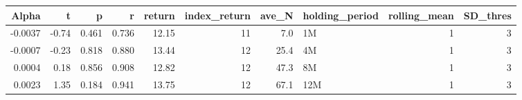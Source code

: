 \begin{table}[ht]
\centering
\begin{tabular}{rrrrrrrlrr}
  \hline
Alpha & t & p & r & return & index\_return & ave\_N & holding\_period & rolling\_mean & SD\_thres \\ 
  \hline
-0.0037 & -0.74 & 0.461 & 0.736 & 12.15 & 11 & 7.0 & 1M &  1 &  3 \\ 
  -0.0007 & -0.23 & 0.818 & 0.880 & 13.44 & 12 & 25.4 & 4M &  1 &  3 \\ 
  0.0004 & 0.18 & 0.856 & 0.908 & 12.82 & 12 & 47.3 & 8M &  1 &  3 \\ 
  0.0023 & 1.35 & 0.184 & 0.941 & 13.75 & 12 & 67.1 & 12M &  1 &  3 \\ 

   \hline
\end{tabular}
\end{table}

